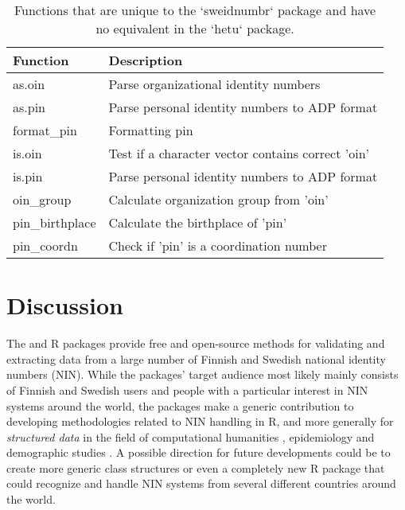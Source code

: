 \begin{table}[!h]
\centering
\caption{\label{tab:swe-function-table}Functions that are unique to the `sweidnumbr` package and have no equivalent in the `hetu` package.}
\centering
\begin{tabular}[t]{ll}
\toprule
Function & Description\\
\midrule
as.oin & Parse organizational identity numbers\\
as.pin & Parse personal identity numbers to ADP format\\
format\_pin & Formatting pin\\
is.oin & Test if a character vector contains correct 'oin'\\
is.pin & Parse personal identity numbers to ADP format\\
\addlinespace
oin\_group & Calculate organization group from 'oin'\\
pin\_birthplace & Calculate the birthplace of 'pin'\\
pin\_coordn & Check if 'pin' is a coordination number\\
\bottomrule
\end{tabular}
\end{table}

\section{Discussion}\label{discussion}

The  and  R packages provide free and open-source methods for validating and extracting data from a large number of Finnish and Swedish national identity numbers (NIN). While the packages' target audience most likely mainly consists of Finnish and Swedish users and people with a particular interest in NIN systems around the world, the packages make a generic contribution to developing methodologies related to NIN handling in R, and more generally for \emph{structured data} in the field of computational humanities \citep[see][]{makela2020}, epidemiology and demographic studies \citep[see][]{gissler2004}. A possible direction for future developments could be to create more generic class structures or even a completely new R package that could recognize and handle NIN systems from several different countries around the world.

